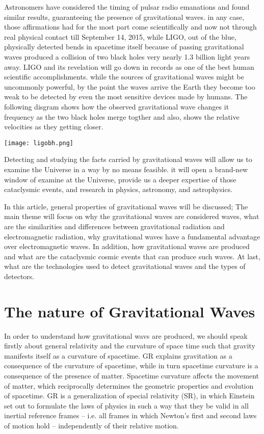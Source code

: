 \documentclass[11]{article}
\begin{document}
\vspace{5mm}
   Astronomers have considered the timing of pulsar radio emanations and found similar results, guaranteeing the presence of gravitational waves. in any case, those affirmations had for the most part come scientifically and now not through real physical contact till September 14, 2015, while LIGO, out of the blue, physically detected bends in spacetime itself because of passing gravitational waves produced a collision of two black holes very nearly 1.3 billion light years away. LIGO and its revelation will go down in records as one of the best human scientific accomplishments. while the sources of gravitational waves might be uncommonly powerful, by the point the waves arrive the Earth they become too weak to be detected by even the most sensitive devices made by humans. The following disgram shows how the observed gravitational wave changes it frequency as the two black holes merge togther and also, shows the relative velocities as they getting closer.
   \begin{center}
\texttt{[image: ligobh.png]}
\end{center}
   
\vspace{5mm}
   Detecting and studying the facts carried by gravitational waves will allow us to examine the Universe in a way by no means feasible. it will open a brand-new window of examine at the Universe, provide us a deeper expertise of those cataclysmic events, and research in physics, astronomy, and astrophysics.

\vspace{5mm}
   In this article, general properties of gravitational waves will be discussed; The main theme will focus on why the gravitational waves are considered waves, what are the similarities and differences between gravitational radiation and electromagnetic radiation, why gravitational waves have a fundamental advantage over electromagnetic waves. In addition, how gravitational waves are produced and what are the cataclysmic cosmic events that can produce such waves. At last, what are the technologies used to detect gravitational waves and the types of detectors.
   
   \section{The nature of Gravitational Waves}
   
   In order to understand how gravitational wavs are produced, we should speak firstly about general relativity and the curvature of space time such that gravity manifests itself as a curvature of spacetime. GR explains gravitation as a consequence of the curvature of spacetime, while in turn spacetime curvature is a consequence of the presence of matter. Spacetime curvature affects the movement of matter, which reciprocally determines the geometric properties and evolution of spacetime.
GR is a generalization of special relativity (SR), in which Einstein set out to formulate
the laws of physics in such a way that they be valid in all inertial reference
frames – i.e. all frames in which Newton’s first and second laws of motion hold
– independently of their relative motion.
\end{document}
